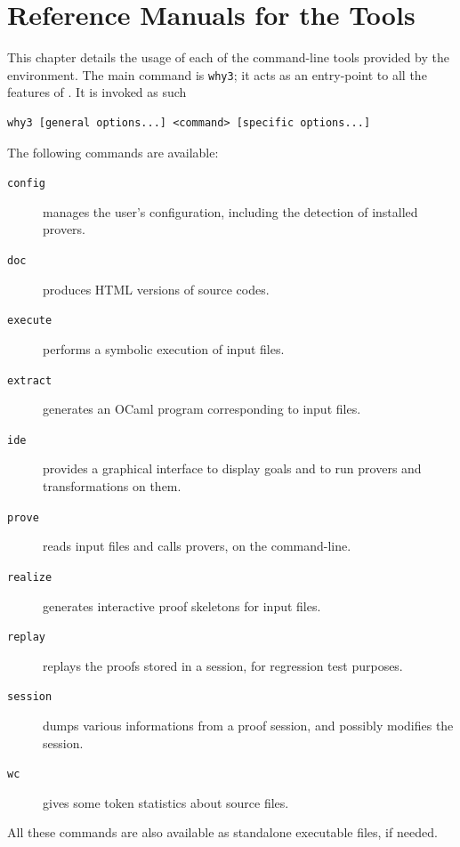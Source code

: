 \chapter{Reference Manuals for the \why Tools}
\label{chap:manpages}

This chapter details the usage of each of the command-line tools
provided by the \why environment. The main command is \texttt{why3};
it acts as an entry-point to all the features of \why. It is invoked
as such
\begin{verbatim}
why3 [general options...] <command> [specific options...]
\end{verbatim}

The following commands are available:
\begin{description}
\item[\texttt{config}] manages the user's configuration,
  including the detection of installed provers.
\item[\texttt{doc}] produces HTML versions of \why source codes.
\item[\texttt{execute}] performs a symbolic execution of \whyml
  input files.
\item[\texttt{extract}] generates an OCaml program corresponding to
  \whyml input files.
\item[\texttt{ide}] provides a graphical interface to display goals
  and to run provers and transformations on them.
\item[\texttt{prove}] reads \whyml input files and calls
  provers, on the command-line.
\item[\texttt{realize}] generates interactive proof skeletons for
  \why input files.
\item[\texttt{replay}] replays the proofs stored in a session,
  for regression test purposes.
\item[\texttt{session}] dumps various informations from a proof
  session, and possibly modifies the session.
\item[\texttt{wc}] gives some token statistics about \whyml
  source files.
\end{description}

All these commands are also available as standalone executable files,
if needed.

